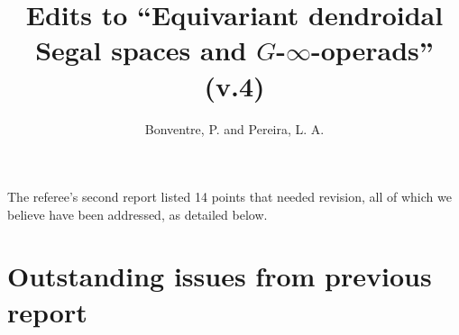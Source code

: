 \documentclass{article}
\begin{document}
 
 
\title{Edits to ``Equivariant dendroidal Segal spaces and $G$-$\infty$-operads'' (v.4)
\\[12pt]} %
 
\author{Bonventre, P. and Pereira, L. A.}
 
\maketitle

The referee's second report listed 14 points that needed revision,
all of which we believe have been addressed, as detailed below.








\section{Outstanding issues from previous report}

\end{document}
